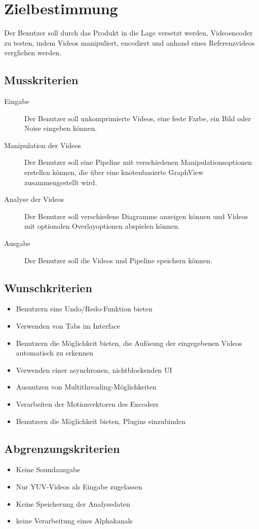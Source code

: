 \section{Zielbestimmung}

Der Benutzer soll durch das Produkt in die Lage versetzt werden, Videoencoder zu testen, indem Videos manipuliert, encodiert und anhand eines Referenzvideos verglichen werden.

\subsection{Musskriterien}

\begin{description}
	\item[Eingabe] Der Benutzer soll unkomprimierte Videos, eine feste Farbe, ein Bild oder Noise eingeben können.
	\item[Manipulation der Videos] Der Benutzer soll eine Pipeline mit verschiedenen Manipulationsoptionen erstellen können, die über eine knotenbasierte GraphView zusammengestellt wird.
	\item[Analyse der Videos] Der Benutzer soll verschiedene Diagramme anzeigen können und Videos mit optionalen Overlayoptionen abspielen können.
	\item[Ausgabe] Der Benutzer soll die Videos und Pipeline speichern können.
\end{description}

\subsection{Wunschkriterien}

\begin{itemize}
	\item Benutzern eine Undo/Redo-Funktion bieten
	\item Verwenden von Tabs im Interface
	\item Benutzern die Möglichkeit bieten, die Aufösung der eingegebenen Videos automatisch zu erkennen
	\item Verwenden einer asynchronen, nichtblockenden UI
	\item Ausnutzen von Multithreading-Möglichkeiten
	\item Verarbeiten der Motionvektoren des Encoders
	\item Benutzern die Möglichkeit bieten, Plugins einzubinden
\end{itemize}

\subsection{Abgrenzungskriterien}

\begin{itemize}
	\item Keine Soundausgabe
	\item Nur YUV-Videos als Eingabe zugelassen
	\item Keine Speicherung der Analysedaten
	\item keine Verarbeitung eines Alphakanals
\end{itemize}
